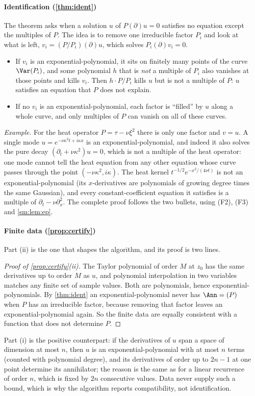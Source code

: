 \paragraph{Identification (\cref{thm:ident})} The theorem asks when a solution $u$ of $P(\partial)u=0$ satisfies no
equation except the multiples of $P$. The idea is to remove one irreducible factor $P_i$ and look at what is left,
$v_i=(P/P_i)(\partial)u$, which solves $P_i(\partial)v_i=0$.
\begin{itemize}
\item If $v_i$ is an exponential-polynomial, it sits on finitely many points of the curve $\Var(P_i)$, and some polynomial
$h$ that is \emph{not} a multiple of $P_i$ also vanishes at those points and kills $v_i$. Then $h\cdot P/P_i$ kills $u$ but
is not a multiple of $P$: $u$ satisfies an equation that $P$ does not explain.
\item If no $v_i$ is an exponential-polynomial, each factor is ``filled'' by $u$ along a whole curve, and only multiples of
$P$ can vanish on all of these curves.
\end{itemize}
\emph{Example.} For the heat operator $P=\tau-\nu\xi^2$ there is only one factor and $v=u$. A single mode
$u=e^{-\nu\kappa^2t+i\kappa x}$ is an exponential-polynomial, and indeed it also solves the pure decay
$(\partial_t+\nu\kappa^2)u=0$, which is not a multiple of the heat operator: one mode cannot tell the heat equation from
any other equation whose curve passes through the point $(-\nu\kappa^2,i\kappa)$. The heat kernel
$t^{-1/2}e^{-x^2/(4\nu t)}$ is not an exponential-polynomial (its $x$-derivatives are polynomials of growing degree times
the same Gaussian), and every constant-coefficient equation it satisfies is a multiple of $\partial_t-\nu\partial_x^2$.
The complete proof follows the two bullets, using (F2), (F3) and \cref{sm:lem:ep}.

\paragraph{Finite data (\cref{prop:certify})} Part (ii) is the one that shapes the algorithm, and its proof is two lines.
\begin{proof}[Proof of \cref{prop:certify}(ii)]
The Taylor polynomial of order $M$ at $z_0$ has the same derivatives up to order $M$ as $u$, and polynomial interpolation
in two variables matches any finite set of sample values. Both are polynomials, hence exponential-polynomials. By
\cref{thm:ident} an exponential-polynomial never has $\Ann=(P)$ when $P$ has an irreducible factor, because removing that
factor leaves an exponential-polynomial again. So the finite data are equally consistent with a function that does not
determine $P$.
\end{proof}
Part (i) is the positive counterpart: if the derivatives of $u$ span a space of dimension at most $n$, then $u$ is an
exponential-polynomial with at most $n$ terms (counted with polynomial degree), and its derivatives of order up to $2n-1$
at one point determine its annihilator; the reason is the same as for a linear recurrence of order $n$, which is fixed by
$2n$ consecutive values. Data never supply such a bound, which is why the algorithm reports compatibility, not
identification.

